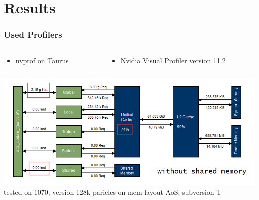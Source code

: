 \documentclass[aspectratio=169]{beamer}
\begin{document}
\section{Results}
\begin{frame}
	\frametitle{Used Profilers}
	\begin{columns}
	\begin{column}{0.3\textwidth}
		\begin{itemize}
			\small \item nvprof on Taurus
		\end{itemize}
	\end{column}
	
	\begin{column}{0.5\textwidth}
		\begin{itemize}
			\small \item Nvidia Visual Profiler version 11.2
		\end{itemize}
	\end{column}
	\end{columns}
	\medskip
	\includegraphics[scale=0.50]{resources/128-1070-aos-update-t.png}
	\smallskip
	\small tested on 1070; version 128k paricles on mem layout AoS; subversion T
\end{frame}
\end{document}
